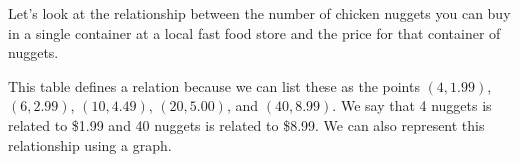 \documentclass[nooutcomes]{ximera}
\begin{document}
\begin{example}
Let's look at the relationship between the number of chicken nuggets
you can buy in a single container at a local fast food store and the
price for that container of nuggets.
\begin{explanation}
This table defines a relation because we can list these as the points $(4,1.99)$, $(6,2.99)$, $(10,4.49)$, $(20,5.00)$, and $(40, 8.99)$.  We say that 4 nuggets is related to \$1.99 and 40 nuggets is related to \$8.99.  We can also represent this relationship using a graph.
  \end{explanation}
\end{example}
\end{document}
